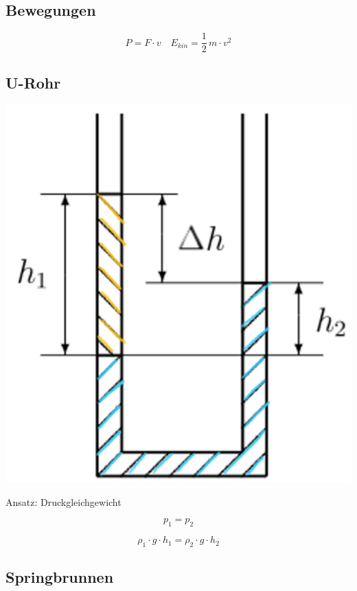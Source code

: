 \subsection{Bewegungen}

$$ \boxed{ P = F \cdot v } \quad \boxed{ E_{kin} = \frac{1}{2} \, m \cdot v^2 } $$


\subsection{U-Rohr}

\begin{minipage}{0.4\linewidth}
\includegraphics[width=\linewidth]{Bilder/u-rohr} \\
\end{minipage}
\hfill
\begin{minipage}{0.55\linewidth}
Ansatz: Druckgleichgewicht 

$$ p_1 = p_2 $$

$$ \rho_1 \cdot g \cdot h_1 = \rho_2 \cdot g \cdot h_2  $$
\end{minipage}


\subsection{Springbrunnen}


